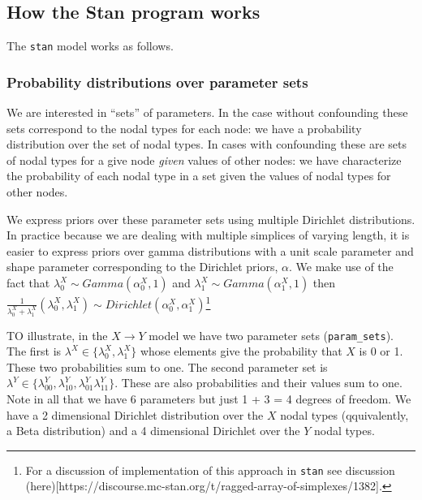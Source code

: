 \documentclass[
  11pt,
  article]{jss}
\begin{document}
\hypertarget{how-the-stan-program-works}{%
\subsection{How the Stan program
works}\label{how-the-stan-program-works}}

The \texttt{stan} model works as follows.

\hypertarget{probability-distributions-over-parameter-sets}{%
\subsubsection{Probability distributions over parameter
sets}\label{probability-distributions-over-parameter-sets}}

We are interested in ``sets'' of parameters. In the case without
confounding these sets correspond to the nodal types for each node: we
have a probability distribution over the set of nodal types. In cases
with confounding these are sets of nodal types for a give node
\emph{given} values of other nodes: we have characterize the probability
of each nodal type in a set given the values of nodal types for other
nodes.

We express priors over these parameter sets using multiple Dirichlet
distributions. In practice because we are dealing with multiple
simplices of varying length, it is easier to express priors over gamma
distributions with a unit scale parameter and shape parameter
corresponding to the Dirichlet priors, \(\alpha\). We make use of the
fact that \(\lambda^X_0 \sim Gamma(\alpha^X_0,1)\) and
\(\lambda^X_1 \sim Gamma(\alpha^X_1,1)\) then
\(\frac{1}{\lambda^X_0 +\lambda^X_1}(\lambda^X_0, \lambda^X_1) \sim Dirichlet(\alpha^X_0, \alpha^X_1)\)\footnote{For
  a discussion of implementation of this approach in \texttt{stan} see
  discussion
  (here){[}https://discourse.mc-stan.org/t/ragged-array-of-simplexes/1382{]}.}

TO illustrate, in the \(X \rightarrow Y\) model we have two parameter
sets (\texttt{param\_sets}). The first is
\(\lambda^X \in \{\lambda^X_0, \lambda^X_1\}\) whose elements give the
probability that \(X\) is 0 or 1. These two probabilities sum to one.
The second parameter set is
\(\lambda^Y \in \{\lambda^Y_{00}, \lambda^Y_{10}, \lambda^Y_{01} \lambda^Y_{11}\}\).
These are also probabilities and their values sum to one. Note in all
that we have 6 parameters but just 1 + 3 = 4 degrees of freedom. We have
a 2 dimensional Dirichlet distribution over the \(X\) nodal types
(qquivalently, a Beta distribution) and a 4 dimensional Dirichlet over
the \(Y\) nodal types.
\end{document}

